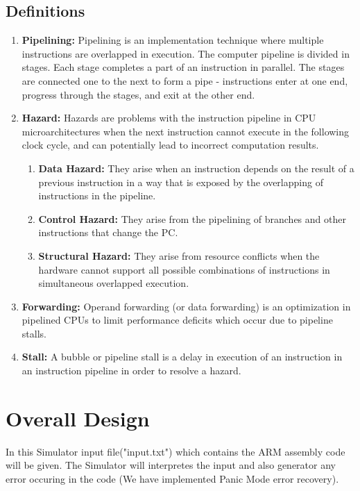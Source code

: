 \documentclass[12pt]{extarticle}
\begin{document}
\subsection{Definitions}
\begin{enumerate}
\item \textbf{Pipelining:} Pipelining is an implementation technique where multiple instructions are overlapped in execution. The computer pipeline is divided in stages. Each stage completes a part of an instruction in parallel. The stages are connected one to the next to form a pipe - instructions enter at one end, progress through the stages, and exit at the other end. 
\item \textbf{Hazard:} Hazards are problems with the instruction pipeline in CPU microarchitectures when the next instruction cannot execute in the following clock cycle, and can potentially lead to incorrect computation results. 
\begin{enumerate}
\item \textbf{Data Hazard:} They arise when an instruction depends on the result of a previous instruction in a way that is exposed by the overlapping of instructions in the pipeline.
\item \textbf{Control Hazard:} They arise from the pipelining of branches and other instructions that change the PC.
\item \textbf{Structural Hazard:} They arise from resource conflicts when the hardware cannot support all possible combinations of instructions in simultaneous overlapped execution.
\end{enumerate}
\item \textbf{Forwarding:} Operand forwarding (or data forwarding) is an optimization in pipelined CPUs to limit performance deficits which occur due to pipeline stalls. 
\item \textbf{Stall:} A bubble or pipeline stall is a delay in execution of an instruction in an instruction pipeline in order to resolve a hazard. 
\end{enumerate}
\section{Overall Design}
In this Simulator input file("input.txt") which contains the ARM assembly code will be given. The Simulator will interpretes the input and also generator any error occuring in the code (We have implemented Panic Mode error recovery).
\end{document}
